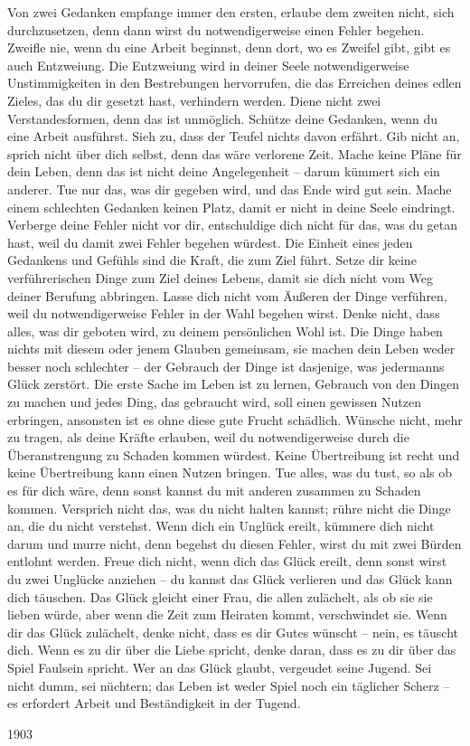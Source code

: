 Von zwei Gedanken empfange immer den ersten, erlaube dem zweiten nicht, sich durchzusetzen, denn dann wirst du notwendigerweise einen Fehler begehen. Zweifle nie, wenn du eine Arbeit beginnst, denn dort, wo es Zweifel gibt, gibt es auch Entzweiung. Die Entzweiung wird in deiner Seele notwendigerweise Unstimmigkeiten in den Bestrebungen hervorrufen, die das Erreichen deines edlen Zieles, das du dir gesetzt hast, verhindern werden. Diene nicht zwei Verstandesformen, denn das ist unmöglich. Schütze deine Gedanken, wenn du eine Arbeit ausführst. Sieh zu, dass der Teufel nichts davon erfährt. Gib nicht an, sprich nicht über dich selbst, denn das wäre verlorene Zeit. Mache keine Pläne für dein Leben, denn das ist nicht deine Angelegenheit -- darum kümmert sich ein anderer. Tue nur das, was dir gegeben wird, und das Ende wird gut sein. Mache einem schlechten Gedanken keinen Platz, damit er nicht in deine Seele eindringt. Verberge deine Fehler nicht vor dir, entschuldige dich nicht für das, was du getan hast, weil du damit zwei Fehler begehen würdest. Die Einheit eines jeden Gedankens und Gefühls sind die Kraft, die zum Ziel führt. Setze dir keine verführerischen Dinge zum Ziel deines Lebens, damit sie dich nicht vom Weg deiner Berufung abbringen. Lasse dich nicht vom Äußeren der Dinge verführen, weil du notwendigerweise Fehler in der Wahl begehen wirst. Denke nicht, dass alles, was dir geboten wird, zu deinem persönlichen Wohl ist. Die Dinge haben nichts mit diesem oder jenem Glauben gemeinsam, sie machen dein Leben weder besser noch schlechter -- der Gebrauch der Dinge ist dasjenige, was jedermanns Glück zerstört. Die erste Sache im Leben ist zu lernen, Gebrauch von den Dingen zu machen und jedes Ding, das gebraucht wird, soll einen gewissen Nutzen erbringen, ansonsten ist es ohne diese gute Frucht schädlich. Wünsche nicht, mehr zu tragen, als deine Kräfte erlauben, weil du notwendigerweise durch die Überanstrengung zu Schaden kommen würdest. Keine Übertreibung ist recht und keine Übertreibung kann einen Nutzen bringen. Tue alles, was du tust, so als ob es für dich wäre, denn sonst kannst du mit anderen zusammen zu Schaden kommen. Versprich nicht das, was du nicht halten kannst; rühre nicht die Dinge an, die du nicht verstehst. Wenn dich ein Unglück ereilt, kümmere dich nicht darum und murre nicht, denn begehst du diesen Fehler, wirst du mit zwei Bürden entlohnt werden. Freue dich nicht, wenn dich das Glück ereilt, denn sonst wirst du zwei Unglücke anziehen -- du kannst das Glück verlieren und das Glück kann dich täuschen. Das Glück gleicht einer Frau, die allen zulächelt, als ob sie sie lieben würde, aber wenn die Zeit zum Heiraten kommt, verschwindet sie. Wenn dir das Glück zulächelt, denke nicht, dass es dir Gutes wünscht -- nein, es täuscht dich. Wenn es zu dir über die Liebe spricht, denke daran, dass es zu dir über das Spiel Faulsein spricht. Wer an das Glück glaubt, vergeudet seine Jugend. Sei nicht dumm, sei nüchtern; das Leben ist weder Spiel noch ein täglicher Scherz -- es erfordert Arbeit und Beständigkeit in der Tugend.

1903

